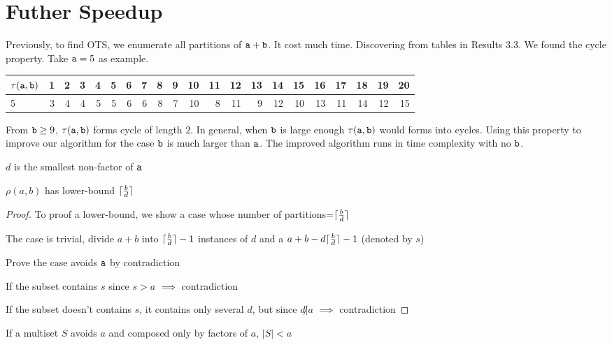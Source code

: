 \section{Futher Speedup}

Previously, to find OTS, we enumerate all partitions of $\mathtt{a}+\mathtt{b}$. It cost much time. Discovering from tables in Results 3.3. We found the cycle property. Take $\mathtt{a}=5$ as example.
\begin{tabular}{l|rrrrrrrrrrrrrrrrrrrr}
 $\tau(\mathtt{a},\mathtt{b})$ &  1 &  2 &  3 &  4 &  5 &  6 &  7 &  8 &  9 & 10 & 11 & 12 & 13 & 14 & 15 & 16 & 17 & 18 & 19 & 20 \\
\hline
 5        &  3 &  4 &  4 &  5 &  5 &  6 &  6 &  8 &  7 & 10 &  8 & 11 &  9 & 12 & 10 & 13 & 11 & 14 & 12 & 15 \\
\hline
\end{tabular}

From $\mathtt{b}\geq 9$, $\tau(\mathtt{a},\mathtt{b})$ forms cycle of length $2$. In general, when $\mathtt{b}$ is large enough $\tau(\mathtt{a},\mathtt{b})$ would forms into cycles.
Using this property to improve our algorithm for the case $\mathtt{b}$ is much larger than $\mathtt{a}$. The improved algorithm runs in time complexity with no $\mathtt{b}$.

\begin{definition}
$d$ is the smallest non-factor of $\mathtt{a}$
\end{definition}
\begin{lemma}
$\rho(a,b)$ has lower-bound $\lceil\frac{b}{d}\rceil$
\end{lemma} 

\begin{proof}
To proof a lower-bound, we show a case whose number of partitions=$\lceil\frac{b}{d}\rceil$

The case is trivial, divide $a+b$ into $\lceil\frac{b}{d}\rceil-1$ instances of $d$ and a $a+b-d\lceil\frac{b}{d}\rceil-1$ (denoted by $s$)

Prove the case avoids $\mathtt{a}$ by contradiction

If the subset contains $s$ since $s>a$ $\implies$ contradiction

If the subset doesn't contains $s$, it contains only several $d$, but since $d\not| a$ $\implies$ contradiction
\end{proof}

\begin{lemma}
If a multiset $S$ avoids $a$ and composed only by factors of $a$, $|S|<a$
\end{lemma}

